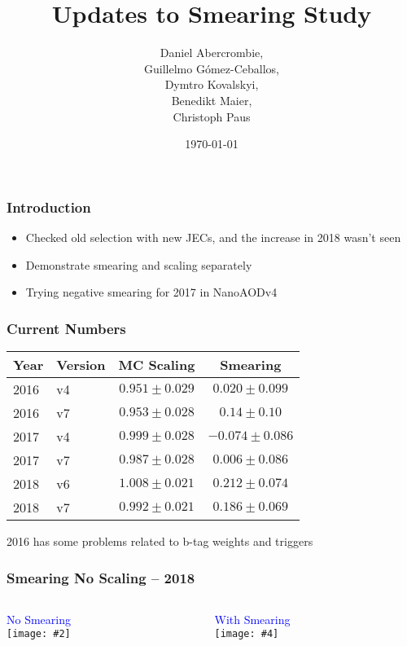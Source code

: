 \documentclass{beamer}
\author[D. Abercrombie]{
  Daniel Abercrombie, \\
  Guillelmo G\'omez-Ceballos, \\
  Dymtro Kovalskyi, \\
  Benedikt Maier, \\
  Christoph Paus
}
\title{\bf \sffamily Updates to Smearing Study}
\date{\today}
\newcommand{\twofigs}[4]{
  \begin{columns}
    \begin{column}{0.5\linewidth}
      \centering
      \textcolor{blue}{#1} \\
      \texttt{[image: \#2]}
    \end{column}
    \begin{column}{0.5\linewidth}
      \centering
      \textcolor{blue}{#3} \\
      \texttt{[image: \#4]}
    \end{column}
  \end{columns}
}
\begin{document}
\begin{frame}
  \titlepage
\end{frame}

\begin{frame}
  \frametitle{Introduction}

  \begin{itemize}
  \item Checked old selection with new JECs, and the increase in 2018 wasn't seen
  \item Demonstrate smearing and scaling separately
  \item Trying negative smearing for 2017 in NanoAODv4
  \end{itemize}

\end{frame}

\begin{frame}
  \frametitle{Current Numbers}

  \vfill
  \def\arraystretch{1.5}
  \begin{center}
    \begin{tabular}{|l|l|c|c|}
      \hline
      Year & Version & MC Scaling & Smearing \\
      \hline
      2016 & v4 & $0.951 \pm 0.029$ & $0.020 \pm 0.099$ \\
      2016 & v7 & $0.953 \pm 0.028$ & $0.14 \pm 0.10$ \\
      2017 & v4 & $0.999 \pm 0.028$ & $-0.074 \pm 0.086$ \\
      2017 & v7 & $0.987 \pm 0.028$ & $0.006 \pm 0.086$ \\
      2018 & v6 & $1.008 \pm 0.021$ & $0.212 \pm 0.074$ \\
      2018 & v7 & $0.992 \pm 0.021$ & $0.186 \pm 0.069$ \\
      \hline
    \end{tabular}
  \end{center}

  2016 has some problems related to b-tag weights and triggers

\end{frame}

\begin{frame}
  \frametitle{Smearing No Scaling -- 2018}

  \twofigs{No Smearing}
          {201008_2018_norm/smearplot_jet1_adjusted_response.pdf}
          {With Smearing}
          {201008_2018_norm/smearplot_jet1_adjusted_response_smeared_nominal.pdf}

\end{frame}
\end{document}
